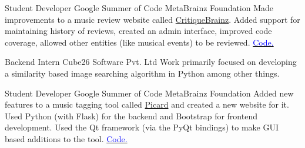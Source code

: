     {Student Developer}
    {Google Summer of Code}
    {MetaBrainz Foundation}
    {}
    {
        Made improvements to a music review website called \href{http://critiquebrainz.org/}{CritiqueBrainz}. Added support for maintaining history of reviews, created an admin interface, improved code coverage, allowed other entities (like musical events) to be reviewed.
        \hfill
        \href{https://bitbucket.org/metabrainz/critiquebrainz/commits/all?author=dufferzafar}{\textcolor{blue}{\scriptsize Code.}}
    }
    \vspace*{0.2\baselineskip}

    {Backend Intern}
    {Cube26 Software Pvt. Ltd}
    {}
    {}
    {
        Work primarily focused on developing a similarity based image searching algorithm in Python among other things.
    }
    \vspace*{0.2\baselineskip}

    {Student Developer}
    {Google Summer of Code}
    {MetaBrainz Foundation}
    {}
    {
        Added new features to a music tagging tool called \href{http://picard.musicbrainz.org/}{Picard} and created a new website for it.
        \newline
        Used Python (with Flask) for the backend and Bootstrap for frontend development.
        Used the Qt framework (via the PyQt bindings) to make GUI based additions to the tool.
        \hfill
        \href{https://github.com/musicbrainz/picard-website/commits?author=dufferzafar}{\textcolor{blue}{\scriptsize Code.}}
    }
    \vspace*{0.2\baselineskip}
